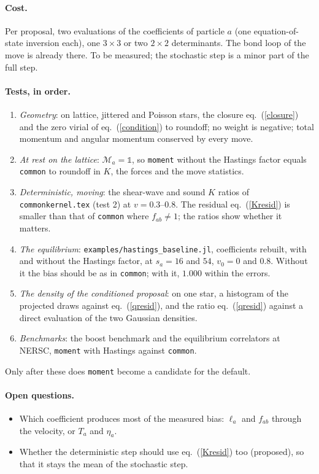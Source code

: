 \documentclass[11pt,aps,preprint,nofootinbib,superscriptaddress,tightenlines]{revtex4-2}
\newcommand{\one}{\mathds{1}}
\def\Eq#1{eq.~(\ref{#1})}
\let\oldparagraph\paragraph
\renewcommand{\paragraph}{\par\bigskip\oldparagraph}
\begin{document}
\paragraph{Cost.}  Per proposal, two evaluations of the coefficients of particle $a$ (one equation-of-state inversion each), one
$3\times3$ or two $2\times2$ determinants.  The bond loop of the move is already there.  To be measured; the stochastic step is a minor part of
the full step.

\paragraph{Tests, in order.}
\begin{enumerate}
\item \emph{Geometry}: on lattice, jittered and Poisson stars, the closure \Eq{closure} and the zero virial of \Eq{condition} to roundoff; no
  weight is negative; total momentum and angular momentum conserved by every move.
\item \emph{At rest on the lattice}: $\mathcal M_a=\one$, so \texttt{moment} without the Hastings factor equals \texttt{common} to roundoff in $K$, the
  forces and the move statistics.
\item \emph{Deterministic, moving}: the shear-wave and sound $K$ ratios of \texttt{commonkernel.tex} (test 2) at $v=0.3$--$0.8$.  The residual
  \Eq{Kresid} is smaller than that of \texttt{common} where $f_{ab}\neq1$; the ratios show whether it matters.
\item \emph{The equilibrium}: \texttt{examples/hastings\_baseline.jl}, coefficients rebuilt, with and without the Hastings factor, at $s_a=16$
  and $54$, $v_0=0$ and $0.8$.  Without it the bias should be as in \texttt{common}; with it, $1.000$ within the errors.
\item \emph{The density of the conditioned proposal}: on one star, a histogram of the projected draws against \Eq{qresid}, and the
  ratio \Eq{qresid} against a direct evaluation of the two Gaussian densities.
\item \emph{Benchmarks}: the boost benchmark and the equilibrium correlators at NERSC, \texttt{moment} with Hastings against \texttt{common}.
\end{enumerate}
Only after these does \texttt{moment} become a candidate for the default.

\paragraph{Open questions.}
\begin{itemize}
\item Which coefficient produces most of the measured bias: $\ell_a$ and $f_{ab}$ through the velocity, or $T_a$ and $\eta_a$.
\item Whether the deterministic step should use \Eq{Kresid} too (proposed), so that it stays the mean of the stochastic step.
\end{itemize}
\end{document}

